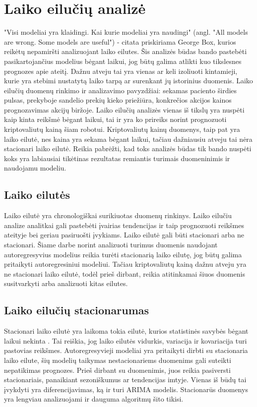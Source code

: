\documentclass{VUMIFInfKursinis}
\begin{document}
\section{Laiko eilučių analizė}
"Visi modeliai yra klaidingi. Kai kurie modeliai yra naudingi" (angl. "All models are wrong. Some models are useful") - citata priskiriama George Box, kurios
reikėtų nepamiršti analizuojant laiko eilutes. Šis analizės būdas bando pastebėti pasikartojančius modelius bėgant laikui, jog būtų galima atlikti kuo tikslesnes
prognozes apie ateitį. 
Dažnu atveju tai yra vienas ar keli izoliuoti kintamieji, kurie yra stebimi nustatytą laiko tarpą ar surenkant jų istorinius duomenis. Laiko eilučių duomenų 
rinkimo ir analizavimo pavyzdžiai: sekamas paciento širdies pulsas, prekyboje sandelio prekių kieko priežiūra, konkrečios akcijos kainos prognozavimas akcijų biržoje. 
Laiko eilučių analizės vienas iš tikslų yra nuspėti kaip kinta reikšmė bėgant laikui, tai ir yra ko prireiks norint prognozuoti kriptovaliutų kainą šiam robotui. 
Kriptovaliutų kainų duomenys, taip pat yra laiko eilutė, nes kaina yra sekama bėgant laikui, tačiau dažniausiu atveju tai nėra stacionari laiko eilutė.
Reikia pabrėžti, kad toks analizės būdas tik bando nuspėti koks yra labiausiai tikėtinas rezultatas remiantis turimais duomeninimis ir naudojamu modeliu. 

\subsection {Laiko eilutės}
Laiko eilutė yra chronologiškai surikiuotas duomenų rinkinys. Laiko eilučiu analize analitkai gali pastebėti įvairias tendencijas ir taip prognozuoti reikšmes
ateityje bei geriau pasiruošti įvykiams. Laiko eilutė gali būti stacionari arba ne stacionari. Šiame darbe norint analizuoti turimus duomenis naudojant 
autoregresyvius modelius reikia turėti stacionarią laiko eilutę, jog būtų galima pritaikyti autoregresiniui modeliui. Tačiau kriptovaliutų kainą dažnu atveju yra
ne stacionari laiko eilutė, todėl prieš dirbant, reikia atitinkamai šiuos duomenis susitvarkyti arba analizuoti kitas eilutes.

\subsection {Laiko eilučių stacionarumas}
Stacionari laiko eilutė yra laikoma tokia eilutė, kurios statistinės savybės bėgant laikui nekinta \cite{nason2006stationary}. Tai reiškia, jog laiko eilutės vidurkis,
variacija ir kovariacija turi pastovias reikšmes. Autoregresyvieji modeliai yra pritaikyti dirbti su stacionaria laiko eilute, šių modelių taikymas
nestacionariems duomenims gali suteikti nepatikimas prognozes. Prieš dirbant su duomenimis, juos reikia pasiversti stacionariais, panaikiant sezoniškumus ar 
tendencijas imtyje. Vienas iš būdų tai įvykdyti yra diferencijavimas, ką ir turi ARIMA modelis.%
Stacionarūs duomenys yra lengviau analizuojami ir dauguma algoritmų šito tikisi.
\end{document}
